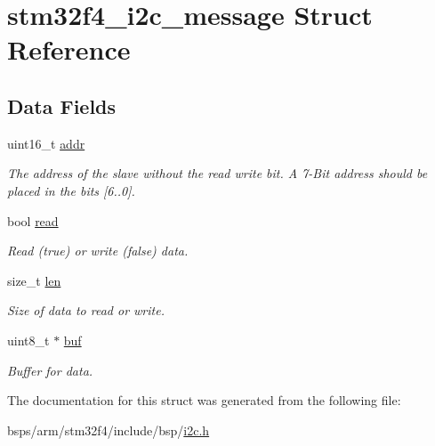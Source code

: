 \hypertarget{structstm32f4__i2c__message}{}\section{stm32f4\+\_\+i2c\+\_\+message Struct Reference}
\label{structstm32f4__i2c__message}
\subsection*{Data Fields}
\begin{DoxyCompactItemize}
\item 
\mbox{\label{structstm32f4__i2c__message_a249889e68e58a63a7c39cf09c049cff3}} 
uint16\+\_\+t \mbox{\hyperlink{structstm32f4__i2c__message_a249889e68e58a63a7c39cf09c049cff3}{addr}}
\begin{DoxyCompactList}\small\item\em The address of the slave without the read write bit. A 7-\/Bit address should be placed in the bits \mbox{[}6..0\mbox{]}. \end{DoxyCompactList}\item 
\mbox{\label{structstm32f4__i2c__message_ae724b6da3348a5f5a51effd434e9e285}} 
bool \mbox{\hyperlink{structstm32f4__i2c__message_ae724b6da3348a5f5a51effd434e9e285}{read}}
\begin{DoxyCompactList}\small\item\em Read (true) or write (false) data. \end{DoxyCompactList}\item 
\mbox{\label{structstm32f4__i2c__message_abfd3a6474d8ceddb29f5d87da3396298}} 
size\+\_\+t \mbox{\hyperlink{structstm32f4__i2c__message_abfd3a6474d8ceddb29f5d87da3396298}{len}}
\begin{DoxyCompactList}\small\item\em Size of data to read or write. \end{DoxyCompactList}\item 
\mbox{\label{structstm32f4__i2c__message_aab0d168ba021eeba68e401c0a6a51b7d}} 
uint8\+\_\+t $\ast$ \mbox{\hyperlink{structstm32f4__i2c__message_aab0d168ba021eeba68e401c0a6a51b7d}{buf}}
\begin{DoxyCompactList}\small\item\em Buffer for data. \end{DoxyCompactList}\end{DoxyCompactItemize}


The documentation for this struct was generated from the following file\+:\begin{DoxyCompactItemize}
\item 
bsps/arm/stm32f4/include/bsp/\mbox{\hyperlink{bsps_2arm_2stm32f4_2include_2bsp_2i2c_8h}{i2c.\+h}}\end{DoxyCompactItemize}
